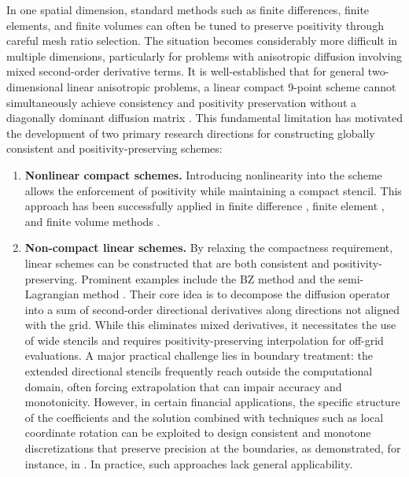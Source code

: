 \documentclass[11pt]{article}
\theoremstyle{mythm}
\theoremstyle{definition}
\begin{document}
	In one spatial dimension, standard methods such as finite differences,
	finite elements, and finite volumes can often be tuned to preserve
	positivity through careful mesh ratio selection.
	The situation becomes considerably more difficult in multiple
	dimensions, particularly for problems with anisotropic diffusion
	involving mixed second-order derivative terms.
	It is well-established that for general two-dimensional linear
	anisotropic problems, a linear compact 9-point scheme cannot
	simultaneously achieve consistency and positivity preservation without a
	diagonally dominant diffusion matrix
	\cite{bib11,bib3,bib13,bib12}.
	This fundamental limitation has motivated the development of two primary
	research directions for constructing globally consistent and
	positivity-preserving schemes:
	\begin{enumerate}
		\item \textbf{Nonlinear compact schemes.}
		Introducing nonlinearity into the scheme allows the enforcement of
		positivity while maintaining a compact stencil.
		This approach has been successfully applied in finite difference
		\cite{bib13}, finite element \cite{bib10}, and finite volume methods
		\cite{bib14,bib17,bib18,bib7,bib20,bib21}.
		
		\item \textbf{Non-compact linear schemes.}
		By relaxing the compactness requirement, linear schemes can be
		constructed that are both consistent and positivity-preserving.
		Prominent examples include the BZ method \cite{bib2} and the
		semi-Lagrangian method \cite{bib4}.
		Their core idea is to decompose the diffusion operator into a sum of
		second-order directional derivatives along directions not aligned with
		the grid.
		While this eliminates mixed derivatives, it necessitates the use of
		wide stencils and requires positivity-preserving interpolation for
		off-grid evaluations.
		A major practical challenge lies in boundary treatment: the extended
		directional stencils frequently reach outside the computational domain,
		often forcing extrapolation that can impair accuracy and monotonicity.
		However, in certain financial applications, the specific structure of
		the coefficients and the solution combined with techniques such as
		local coordinate rotation can be exploited to design consistent and
		monotone discretizations that preserve precision at the boundaries, as
		demonstrated, for instance, in \cite{bib24}.
		In practice, such approaches lack general applicability.
	\end{enumerate}
	
\end{document}
